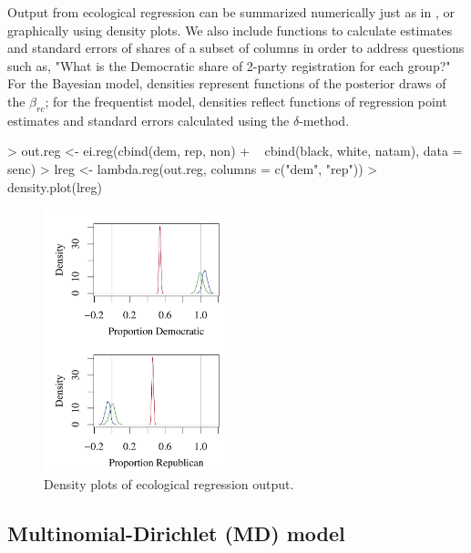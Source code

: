 Output from ecological regression can be summarized numerically just
as in , or graphically using density plots.  We also
include functions to calculate estimates and standard errors of shares
of a subset of columns in order to address questions such as, "What is
the Democratic share of 2-party registration for each group?"  For the
Bayesian model, densities represent functions of the posterior draws
of the $\beta_{rc}$; for the frequentist model, densities reflect
functions of regression point estimates and standard errors calculated
using the $\delta$-method.
\begin{smallexample}
> out.reg <- ei.reg(cbind(dem, rep, non) 
+   ~ cbind(black, white, natam), data = senc)
> lreg <- lambda.reg(out.reg, 
    columns = c("dem", "rep"))
> density.plot(lreg)
\end{smallexample}
\begin{figure}[h]
\begin{center}
\includegraphics[height=3in]{eiBayesReg.pdf}
\end{center}
\caption{Density plots of ecological regression output.}
\label{f:er}
\end{figure}



\subsection*{Multinomial-Dirichlet (MD) model}


